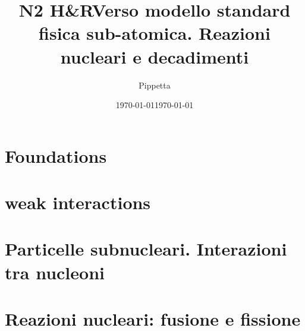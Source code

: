 \documentclass[oneside,12pt,fleqn]{memoir}
\author{Pippetta}
\title{N2 H\&R}
\date{\today}
\begin{document}
\frontmatter
\maketitle
{}
\tableofcontents*

\mainmatter
\title{Verso modello standard fisica sub-atomica. Reazioni nucleari e decadimenti}
\date{\today}

\part{Foundations}


\part{weak interactions}


\part{Particelle subnucleari. Interazioni tra nucleoni}


\part{Reazioni nucleari: fusione e fissione}


\clearpage
{}
\printindex
\end{document}
